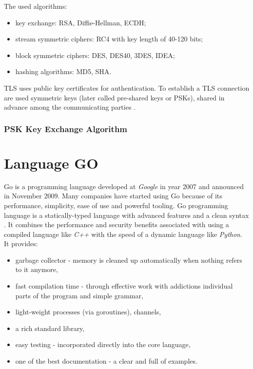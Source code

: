 \documentclass[
  digital, %
  notable,   %
  lof,     %
  lot,     %
]{fithesis3}
\begin{document}
\vskip0.2in
The used algorithms:
\begin{itemize}[leftmargin=2em,rightmargin=1em,itemsep=0.75\parskip,parsep=0em,topsep=0em,partopsep=0em]
\item key exchange: RSA, Diffie-Hellman, ECDH;
\item stream symmetric ciphers: RC4 with key length of 40-120 bits;
\item block symmetric ciphers: DES, DES40, 3DES, IDEA;
\item hashing algorithms: MD5, SHA.
\end{itemize}
\vskip0.2in
TLS uses public key certificates for authentication. To establish a TLS connection are used 
symmetric keys (later called pre-shared keys or PSKs), shared in advance among the 
communicating parties \cite{eronen2005pre}.

\subsection{PSK Key Exchange Algorithm}

\chapter{Language GO}
Go is a programming language developed at \textit{Google} in year 2007 and announced in November 
2009. Many companies have started using Go because of its performance, simplicity, ease of use 
and powerful tooling. Go programming language is a statically-typed language with advanced 
features and a clean syntax \cite{doxsey2016introducing}. It combines the performance and 
security benefits associated with using a compiled language like \textit{C++} with the speed of 
a dynamic language like \textit{Python}. It provides:
\vskip0.2in
\begin{itemize}[leftmargin=2em,rightmargin=1em,itemsep=0.75\parskip,parsep=0em,topsep=0em,partopsep=0em]
\item garbage collector - memory is cleaned up automatically when nothing refers to it anymore,
\item fast compilation time - through effective work with addictions individual parts of the 
program and simple grammar,
\item light-weight processes (via goroutines), channels,
\item a rich standard library,
\item easy testing - incorporated directly into the core language,
\item one of the best documentation - a clear and full of examples.
\end{itemize}
\vskip0.2in
\end{document}
